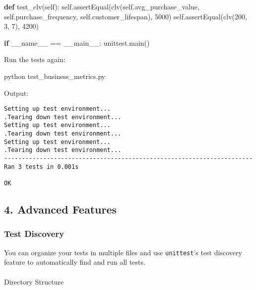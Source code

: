 \documentclass[
  letterpaper,
  DIV=11,
  numbers=noendperiod]{scrreprt}
\makeatletter
\let\oldparagraph\paragraph
\renewcommand{\paragraph}{
    \@ifstar
      \xxxParagraphStar
      \xxxParagraphNoStar
  }
\newcommand{\xxxParagraphStar}[1]{\oldparagraph*{#1}\mbox{}}
\newcommand{\xxxParagraphNoStar}[1]{\oldparagraph{#1}\mbox{}}
\newenvironment{Shaded}{\begin{snugshade}}{\end{snugshade}}
\newcommand{\ControlFlowTok}[1]{\textcolor[rgb]{0.00,0.23,0.31}{\textbf{#1}}}
\newcommand{\DecValTok}[1]{\textcolor[rgb]{0.68,0.00,0.00}{#1}}
\newcommand{\ExtensionTok}[1]{\textcolor[rgb]{0.00,0.23,0.31}{#1}}
\newcommand{\KeywordTok}[1]{\textcolor[rgb]{0.00,0.23,0.31}{\textbf{#1}}}
\newcommand{\NormalTok}[1]{\textcolor[rgb]{0.00,0.23,0.31}{#1}}
\newcommand{\OperatorTok}[1]{\textcolor[rgb]{0.37,0.37,0.37}{#1}}
\newcommand{\StringTok}[1]{\textcolor[rgb]{0.13,0.47,0.30}{#1}}
\newcommand{\VariableTok}[1]{\textcolor[rgb]{0.07,0.07,0.07}{#1}}
\makeatother
\begin{document}
\begin{Shaded}
\begin{Highlighting}[]
    \KeywordTok{def}\NormalTok{ test\_clv(}\VariableTok{self}\NormalTok{):}
        \VariableTok{self}\NormalTok{.assertEqual(clv(}\VariableTok{self}\NormalTok{.avg\_purchase\_value, }\VariableTok{self}\NormalTok{.purchase\_frequency, }\VariableTok{self}\NormalTok{.customer\_lifespan), }\DecValTok{5000}\NormalTok{)}
        \VariableTok{self}\NormalTok{.assertEqual(clv(}\DecValTok{200}\NormalTok{, }\DecValTok{3}\NormalTok{, }\DecValTok{7}\NormalTok{), }\DecValTok{4200}\NormalTok{)}

\ControlFlowTok{if} \VariableTok{\_\_name\_\_} \OperatorTok{==} \StringTok{\textquotesingle{}\_\_main\_\_\textquotesingle{}}\NormalTok{:}
\NormalTok{    unittest.main()}
\end{Highlighting}
\end{Shaded}

Run the tests again:

\begin{Shaded}
\begin{Highlighting}[]
\ExtensionTok{python}\NormalTok{ test\_business\_metrics.py}
\end{Highlighting}
\end{Shaded}

Output:

\begin{verbatim}
Setting up test environment...
.Tearing down test environment...
Setting up test environment...
.Tearing down test environment...
Setting up test environment...
.Tearing down test environment...
----------------------------------------------------------------------
Ran 3 tests in 0.001s

OK
\end{verbatim}

\subsection{4. Advanced Features}\label{advanced-features}

\subsubsection{Test Discovery}\label{test-discovery}

You can organize your tests in multiple files and use
\texttt{unittest}'s test discovery feature to automatically find and run
all tests.

\paragraph{Directory Structure}\label{directory-structure}
\end{document}

